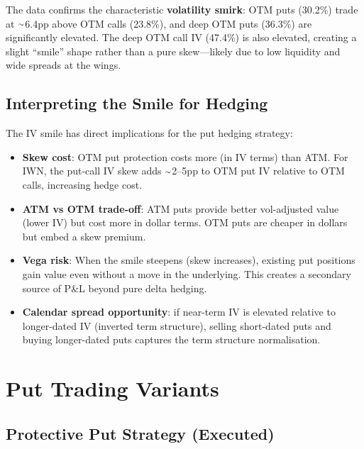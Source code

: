 \documentclass[11pt,letterpaper]{article}
\begin{document}
The data confirms the characteristic \textbf{volatility smirk}: OTM puts
(30.2\%) trade at ${\raise.17ex\hbox{$\scriptstyle\sim$}}$6.4pp above OTM
calls (23.8\%), and deep OTM puts (36.3\%) are significantly elevated.
The deep OTM call IV (47.4\%) is also elevated, creating a slight ``smile''
shape rather than a pure skew---likely due to low liquidity and wide spreads
at the wings.

\subsection{Interpreting the Smile for Hedging}

The IV smile has direct implications for the put hedging strategy:

\medskip
\begin{itemize}[itemsep=4pt]
  \item \textbf{Skew cost}: OTM put protection costs more (in IV terms) than
        ATM. For IWN, the put-call IV skew adds
        ${\raise.17ex\hbox{$\scriptstyle\sim$}}$2--5pp to OTM put IV relative
        to OTM calls, increasing hedge cost.
  \item \textbf{ATM vs OTM trade-off}: ATM puts provide better vol-adjusted
        value (lower IV) but cost more in dollar terms. OTM puts are cheaper
        in dollars but embed a skew premium.
  \item \textbf{Vega risk}: When the smile steepens (skew increases), existing
        put positions gain value even without a move in the underlying. This
        creates a secondary source of P\&L beyond pure delta hedging.
  \item \textbf{Calendar spread opportunity}: if near-term IV is elevated
        relative to longer-dated IV (inverted term structure), selling
        short-dated puts and buying longer-dated puts captures the term
        structure normalisation.
\end{itemize}

\section{Put Trading Variants}

\subsection{Protective Put Strategy (Executed)}
\end{document}
